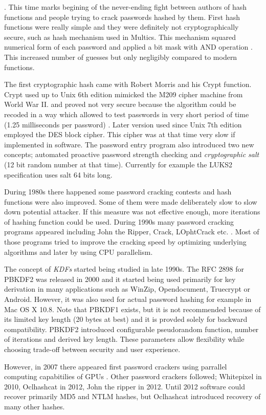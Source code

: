 \documentclass[nolof]{fithesis3}
\begin{document}
. This time marks begining of the never-ending fight between authors of hash functions and people trying to crack passwords hashed by them. First hash functions were really simple and they were definitely not cryptographically secure, such as hash mechanism used in Multics. This mechanism squared numerical form of each password and applied a bit mask with AND operation \parencite{multicssecurity}. This increased number of guesses but only negligibly compared to modern functions.

The first cryptographic hash came with Robert Morris and his Crypt function. Crypt used up to Unix 6th edition mimicked the M209 cipher machine from World War II. and proved not very secure because the algorithm could be recoded in a way which allowed to test passwords in very short period of time (1.25 milliseconds per password) \parencite{pshistory}. Later version used since Unix 7th edition employed the DES block cipher. This cipher was at that time very slow if implemented in software. The password entry program also introduced two new concepts; automated proactive password strength checking and \emph{cryptographic salt} (12 bit random number at that time). Currently for example the LUKS2 specification uses salt 64 bits long.

During 1980s there happened some password cracking contests and hash functions were also improved. Some of them were made deliberately slow to slow down potential attacker. If this measure was not effective enough, more iterations of hashing function could be used. During 1990s many password cracking programs appeared including John the Ripper, Crack, LOphtCrack etc. \parencite{crackinghistory}. Most of those programs tried to improve the cracking speed by optimizing underlying algorithms and later by using CPU parallelism.

The concept of \emph{KDFs} started being studied in late 1990s. The RFC 2898 for PBKDF2 was released in 2000 and it started being used primarily for key derivation in many applications such as WinZip, Opendocument, Truecrypt or Android. However, it was also used for actual password hashing for example in Mac OS X 10.8. Note that PBKDF1 exists, but it is not recommended because of its limited key length (20 bytes at best) and it is provded solely for backward compatibility. PBKDF2 introduced configurable pseudorandom function, number of iterations and derived key length. These parameters allow flexibility while choosing trade-off between security and user experience.

However, in 2007 there appeared first password crackers using parrallel computing capabitilies of GPUs \parencite{elcomsoftgpu}. Other password crackers followed; Whitepixel in 2010, Oclhashcat in 2012, John the ripper in 2012. Until 2012 software could recover primarily MD5 and NTLM hashes, but Oclhashcat introduced recovery of many other hashes.
\end{document}
